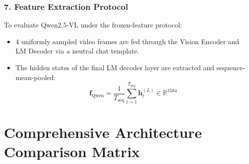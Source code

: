 \documentclass[a4paper, 11pt]{article}
\begin{document}
\subsubsection{7. Feature Extraction Protocol}
To evaluate Qwen2.5-VL under the frozen-feature protocol:
\begin{itemize}
    \item 4 uniformly sampled video frames are fed through the Vision Encoder and LM Decoder via a neutral chat template.
    \item The hidden states of the final LM decoder layer are extracted and sequence-mean-pooled:
    \begin{equation}
        \mathbf{f}_{\text{Qwen}} = \frac{1}{T_{\text{seq}}} \sum_{t=1}^{T_{\text{seq}}} \mathbf{h}_t^{(L)} \in \mathbb{R}^{3584}
    \end{equation}
\end{itemize}

\vspace{0.3cm}

\section{Comprehensive Architecture Comparison Matrix}
\end{document}
